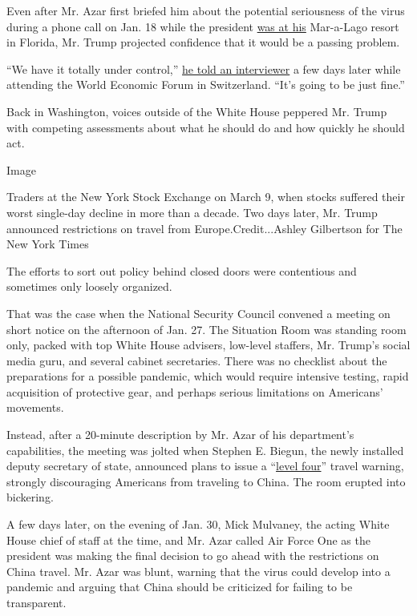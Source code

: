 Even after Mr. Azar first briefed him about the potential seriousness of
the virus during a phone call on Jan. 18 while the president
\href{https://www.nytimes.com/interactive/2017/04/05/us/politics/tracking-trumps-visits-to-his-branded-properties.html}{was
at his} Mar-a-Lago resort in Florida, Mr. Trump projected confidence
that it would be a passing problem.

``We have it totally under control,''
\href{https://www.cnbc.com/2020/01/22/cnbc-transcript-president-donald-trump-sits-down-with-cnbcs-joe-kernen-at-the-world-economic-forum-in-davos-switzerland.html}{he
told an interviewer} a few days later while attending the World Economic
Forum in Switzerland. ``It's going to be just fine.''

Back in Washington, voices outside of the White House peppered Mr. Trump
with competing assessments about what he should do and how quickly he
should act.

Image

Traders at the New York Stock Exchange on March 9, when stocks suffered
their worst single-day decline in more than a decade. Two days later,
Mr. Trump announced restrictions on travel from Europe.Credit...Ashley
Gilbertson for The New York Times

The efforts to sort out policy behind closed doors were contentious and
sometimes only loosely organized.

That was the case when the National Security Council convened a meeting
on short notice on the afternoon of Jan. 27. The Situation Room was
standing room only, packed with top White House advisers, low-level
staffers, Mr. Trump's social media guru, and several cabinet
secretaries. There was no checklist about the preparations for a
possible pandemic, which would require intensive testing, rapid
acquisition of protective gear, and perhaps serious limitations on
Americans' movements.

Instead, after a 20-minute description by Mr. Azar of his department's
capabilities, the meeting was jolted when Stephen E. Biegun, the newly
installed deputy secretary of state, announced plans to issue a
``\href{https://travel.state.gov/content/travel/en/traveladvisories/ea/travel-advisory-alert-global-level-4-health-advisory-issue.html}{level
four}'' travel warning, strongly discouraging Americans from traveling
to China. The room erupted into bickering.

A few days later, on the evening of Jan. 30, Mick Mulvaney, the acting
White House chief of staff at the time, and Mr. Azar called Air Force
One as the president was making the final decision to go ahead with the
restrictions on China travel. Mr. Azar was blunt, warning that the virus
could develop into a pandemic and arguing that China should be
criticized for failing to be transparent.

